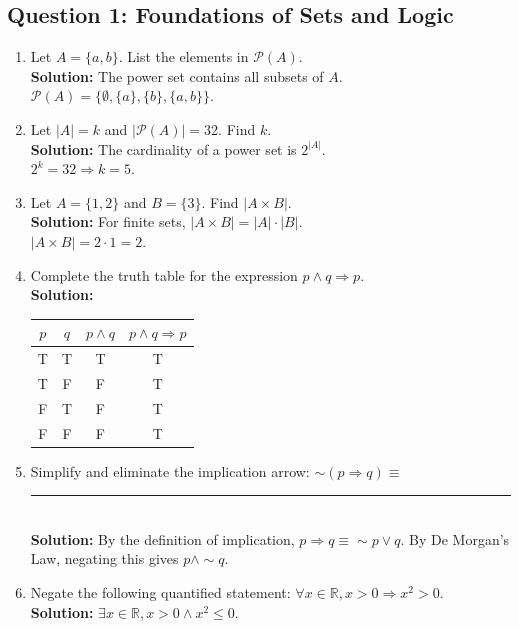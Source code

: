 \documentclass[11pt]{article}
\begin{document}
\subsection*{Question 1: Foundations of Sets and Logic}
\begin{enumerate}[label=(\roman*)]
    \item Let $A = \{a, b\}$. List the elements in $\mathcal{P}(A)$.\\
    \textbf{Solution:} The power set contains all subsets of $A$. \\
    $\mathcal{P}(A) = \{\emptyset, \{a\}, \{b\}, \{a, b\}\}$.

    \item Let $|A| = k$ and $|\mathcal{P}(A)| = 32$. Find $k$.\\
    \textbf{Solution:} The cardinality of a power set is $2^{|A|}$. \\
    $2^k = 32 \Rightarrow k = 5$.

    \item Let $A = \{1, 2\}$ and $B = \{3\}$. Find $|A \times B|$.\\
    \textbf{Solution:} For finite sets, $|A \times B| = |A| \cdot |B|$. \\
    $|A \times B| = 2 \cdot 1 = 2$.

    \item Complete the truth table for the expression $p \wedge q \Rightarrow p$.\\
    \textbf{Solution:} 
    \begin{center}
    \begin{tabular}{|c|c|c|c|}
    \hline
    $p$ & $q$ & $p \wedge q$ & $p \wedge q \Rightarrow p$ \\
    \hline
    T & T & T & T \\
    T & F & F & T \\
    F & T & F & T \\
    F & F & F & T \\
    \hline
    \end{tabular}
    \end{center}

    \item Simplify and eliminate the implication arrow: $\sim(p \Rightarrow q) \equiv$ \rule{3cm}{0.15mm} \\
    \textbf{Solution:} By the definition of implication, $p \Rightarrow q \equiv \sim p \vee q$. By De Morgan's Law, negating this gives $p \wedge \sim q$.

    \item Negate the following quantified statement: $\forall x \in \mathbb{R}, x > 0 \Rightarrow x^2 > 0$.\\
    \textbf{Solution:} $\exists x \in \mathbb{R}, x > 0 \wedge x^2 \leq 0$.


\end{enumerate}
\end{document}

